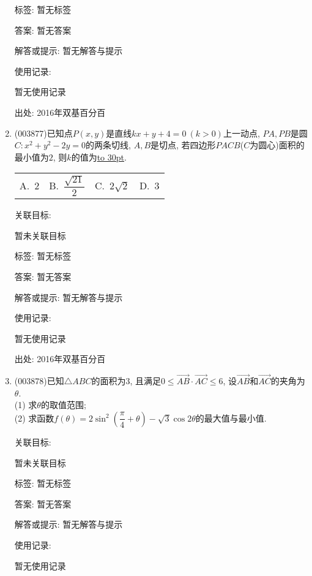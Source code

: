 \documentclass[10pt,a4paper]{article}
\newcommand{\blank}[1]{\underline{\hbox to #1pt{}}}
\newcommand{\fourch}[4]{\par\begin{tabular}{p{.23\textwidth}p{.23\textwidth}p{.23\textwidth}p{.23\textwidth}}
A.~#1 &B.~#2& C.~#3& D.~#4
\end{tabular}}
\begin{document}
\begin{enumerate}[1.]
标签: 暂无标签

答案: 暂无答案

解答或提示: 暂无解答与提示

使用记录:

暂无使用记录


出处: 2016年双基百分百
\item { (003877)}已知点$P(x,y)$是直线$kx+y+4=0 \ (k>0)$上一动点, $PA,PB$是圆$C:x^2+y^2-2y=0$的两条切线, $A,B$是切点, 若四边形$PACB$($C$为圆心)面积的最小值为$2$, 则$k$的值为\blank{30}.
\fourch{$2$}{$\dfrac{\sqrt{21}}{2}$}{$2\sqrt{2}$}{$3$}


关联目标:

暂未关联目标



标签: 暂无标签

答案: 暂无答案

解答或提示: 暂无解答与提示

使用记录:

暂无使用记录


出处: 2016年双基百分百
\item { (003878)}已知$\triangle ABC$的面积为$3$, 且满足$0\le \overrightarrow{AB}\cdot\overrightarrow{AC}\le 6$, 设$\overrightarrow{AB}$和$\overrightarrow{AC}$的夹角为$\theta$.\\
(1) 求$\theta$的取值范围;\\
(2) 求函数$f(\theta)=2\sin^2\left(\dfrac{\pi}{4}+\theta\right)-\sqrt{3}\cos 2\theta$的最大值与最小值.


关联目标:

暂未关联目标



标签: 暂无标签

答案: 暂无答案

解答或提示: 暂无解答与提示

使用记录:

暂无使用记录



\end{enumerate}
\end{document}
